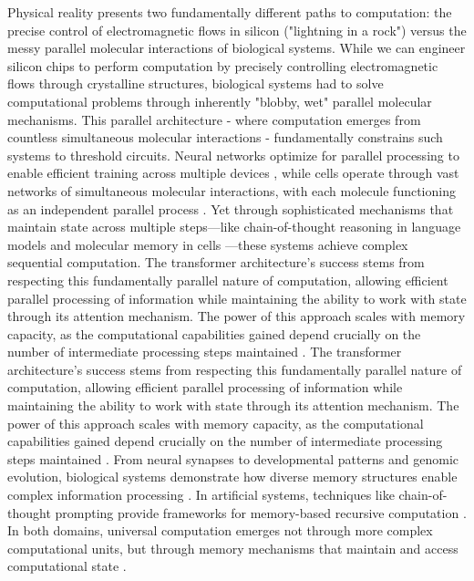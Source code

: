 \documentclass[12pt]{article}
\begin{document}
Physical reality presents two fundamentally different paths to computation: the precise control of electromagnetic flows in silicon ("lightning in a rock") versus the messy parallel molecular interactions of biological systems.
While we can engineer silicon chips to perform computation by precisely controlling electromagnetic flows through crystalline structures, biological systems had to solve computational problems through inherently "blobby, wet" parallel molecular mechanisms.
This parallel architecture - where computation emerges from countless simultaneous molecular interactions - fundamentally constrains such systems to threshold circuits.
Neural networks optimize for parallel processing to enable efficient training across multiple devices \cite{merrill2023parallelism,merrill2024}, while cells operate through vast networks of simultaneous molecular interactions, with each molecule functioning as an independent parallel process \cite{fu2023scgrn}.
Yet through sophisticated mechanisms that maintain state across multiple steps---like chain-of-thought reasoning in language models \cite{wei2022chain,qiu2024ask} and molecular memory in cells \cite{hoel2020emergence}---these systems achieve complex sequential computation.
The transformer architecture's success stems from respecting this fundamentally parallel nature of computation, allowing efficient parallel processing of information while maintaining the ability to work with state through its attention mechanism.
The power of this approach scales with memory capacity, as the computational capabilities gained depend crucially on the number of intermediate processing steps maintained \cite{merrill2024}.
The transformer architecture's success stems from respecting this fundamentally parallel nature of computation, allowing efficient parallel processing of information while maintaining the ability to work with state through its attention mechanism.
The power of this approach scales with memory capacity, as the computational capabilities gained depend crucially on the number of intermediate processing steps maintained \cite{merrill2024}.
From neural synapses to developmental patterns and genomic evolution, biological systems demonstrate how diverse memory structures enable complex information processing \cite{burrill2010making,espinosa2024molecular}.
In artificial systems, techniques like chain-of-thought prompting provide frameworks for memory-based recursive computation \cite{wei2022chain,dickson2024trust,ahn2024recursive}.
In both domains, universal computation emerges not through more complex computational units, but through memory mechanisms that maintain and access computational state \cite{schuurmans2024autoregressive}.
\end{document}
